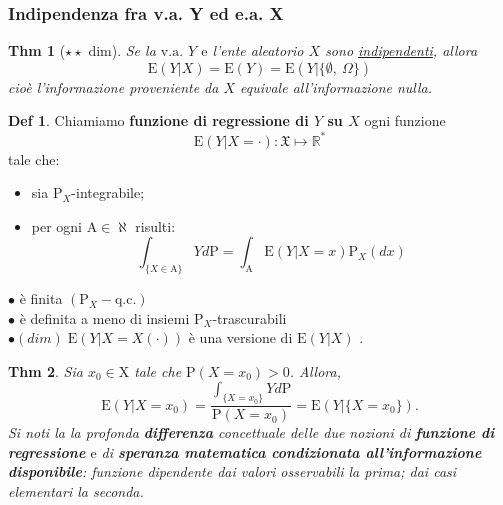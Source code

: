 \documentclass[a4paper,11pt]{article}
\theoremstyle{plain}
\newtheorem{thm}{Thm}[section]
\theoremstyle{definition}
\newtheorem{defn}{Def}[section]
\theoremstyle{remark}
\begin{document}
\subsubsection{Indipendenza fra v.a. Y ed e.a. X}
\begin{thm}[$\star \star$ dim]
Se la $\mathrm{v}.\mathrm{a}.$ $ Y$ $ \mathrm{e}$ l'ente aleatorio $X$ sono \underline{indipendenti}, allora
$$
\mathrm{E}(Y|X)=\mathrm{E}(Y)=\mathrm{E}(Y|\{\emptyset,\ \Omega\})
$$
cioè l'informazione proveniente da $X$ equivale all'informazione nulla.
\end{thm}


\begin{defn}
Chiamiamo \textbf{funzione di regressione di $Y$ su $X$} ogni funzione
$$
\mathrm{E}(Y|X=\cdot):\mathfrak{X}\mapsto \mathbb{R}^{*}
$$
tale $\mathrm{c}\mathrm{h}\mathrm{e}$:
\begin{itemize}
\item [1.] sia $\mathrm{P}_{X}$-integrabile;
\item [2.] per ogni $\mathrm{A}\in\aleph$ risulti:
$$
\int_{\{X\in \mathrm{A}\}}Yd\mathrm{P}=\int_{\mathrm{A}}\mathrm{E}(Y|X=x)\mathrm{P}_{X}(dx)
$$
\end{itemize}
\end{defn}


$\bullet$ \`{e} finita $(\mathrm{P}_{X}-\mathrm{q}.\mathrm{c}.)$\\

$\bullet$ \`{e} definita a meno di insiemi $\mathrm{P}_{X}$-trascurabili\\

$\bullet (dim) \; \mathrm{E}(Y|X=X(\cdot))$ \`{e} una versione di $\mathrm{E}(Y|X)$ .

\begin{thm}
Sia $x_{0}\in \mathrm{X}$ tale che $\mathrm{P}(X=x_{0})>0$. Allora,
$$ 
\mathrm{E}(Y|X=x_{0})=\frac{\displaystyle \int_{\{X=x_{0}\}}Yd\mathrm{P}}{\mathrm{P}(X=x_{0})}=\mathrm{E}(Y|\{X=x_{0}\}).
$$
Si noti la la profonda \textbf{differenza} concettuale delle due nozioni di \textbf{funzione di regressione} $\mathrm{e}$ di \textbf{speranza matematica condizionata all'informazione disponibile}: funzione dipendente dai {\it valori osservabili} la prima; dai {\it casi elementari} la seconda.
\end{thm}
\end{document}
